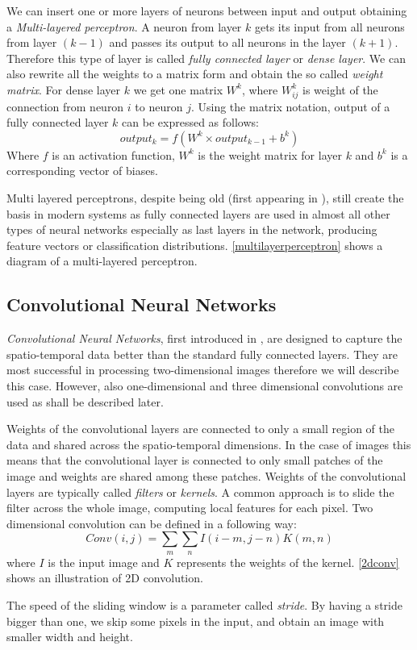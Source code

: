 We can insert one or more layers of neurons between input and output obtaining a \textit{Multi-layered perceptron}. A neuron from layer $k$ gets its input from all neurons from layer $(k-1)$ and passes its output to all neurons in the layer $(k+1)$. Therefore this type of layer is called \textit{fully connected layer} or \textit{dense layer}.  We can also rewrite all the weights to a matrix form and obtain the so called \textit{weight matrix}. For dense layer $k$ we get one matrix $W^k$, where $W_{ij}^k$ is weight of the connection from neuron $i$ to neuron $j$. Using the matrix notation, output of a fully connected layer $k$ can be expressed as follows: 
$$output_k = f(W^k \times output_{k-1} + b^k)$$
Where $f$ is an activation function, $W^k$ is the weight matrix for layer $k$ and $b^k$ is a corresponding vector of biases.\par  
Multi layered perceptrons, despite being old (first appearing in \cite{rosenblatt_principles_1961}), still create the basis in modern systems as fully connected layers are used in almost all other types of neural networks especially as last layers in the network, producing feature vectors or classification distributions. \autoref{multilayerperceptron} shows a diagram of a multi-layered perceptron.



\subsection{Convolutional Neural Networks}
\textit{Convolutional Neural Networks}, first introduced in \cite{lecun_backpropagation_1989}, are designed to capture the spatio-temporal data better than the standard fully connected layers. They are most successful in processing two-dimensional images therefore we will describe this case. However, also one-dimensional and three dimensional convolutions are used as shall be described later.  \par
Weights of the convolutional layers are connected to only a small region of the data and shared across the spatio-temporal dimensions. In the case of images this means that the convolutional layer is connected to only small patches of the image and weights are shared among these patches. Weights of the convolutional layers are typically called \textit{filters} or \textit{kernels}. A common approach is to slide the filter across the whole image,  computing local features for each pixel.
Two dimensional convolution can be defined in a following way:
$$Conv(i,j) = \sum_m {\sum_n {I(i-m,j-n)K(m,n)}}$$ where $I$ is the input image and $K$ represents the weights of the kernel. \autoref{2dconv} shows an illustration of 2D convolution. \par
The speed of the sliding window is a parameter called \textit{stride}. By having a stride bigger than one, we skip some pixels in the input, and obtain an image with smaller width and height.\par 

